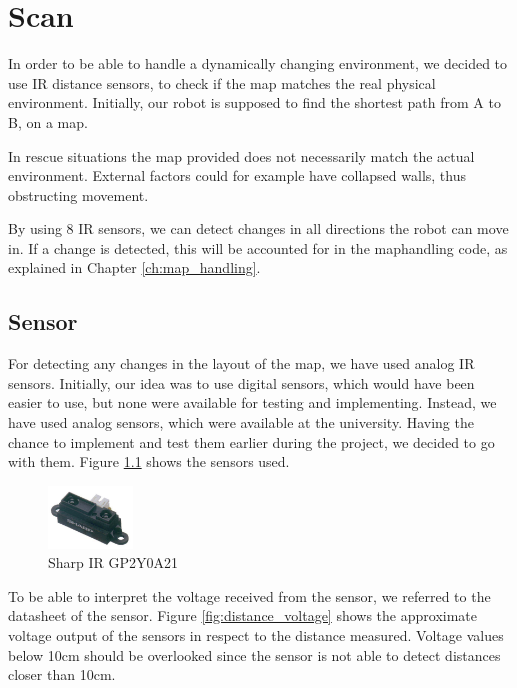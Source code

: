\chapter{Scan}\label{ch:scan}
In order to be able to handle a dynamically changing environment,
we decided to use IR distance sensors,
to check if the map matches the real physical environment.
Initially, our robot is supposed to find the 
shortest path from A to B, on a map.

In rescue situations the map provided does not necessarily match 
the actual environment.
External factors could for example have collapsed walls,
thus obstructing movement.

By using 8 IR sensors, we can detect changes in all directions 
the robot can move in. If a change is detected, this will be
accounted for in the maphandling code,
as explained in Chapter \ref{ch:map_handling}.

\newpage
\section{Sensor}\label{sec:sensor}
For detecting any changes in the layout of the map, we have used analog IR 
sensors. Initially, our idea was to use digital sensors, which would have been 
easier to use, but none were available for testing and implementing. Instead, 
we have used analog sensors, which were available at the university. Having the 
chance to implement and test them earlier during the project, we decided to go 
with them. 
Figure \ref{fig:sensor} shows the sensors used.

\begin{figure}[htp]
	\centering
	\includegraphics[width=0.2\textwidth]{figures/scan/Sensor.png}
	\caption{Sharp IR GP2Y0A21}
	\label{fig:sensor}
\end{figure}
%
To be able to interpret the voltage received from the sensor, we referred 
to the datasheet of the sensor. Figure \ref{fig:distance_voltage} shows
the approximate voltage output of the sensors in respect to the distance measured.
Voltage values below 10cm should be overlooked since the sensor is not able
to detect distances closer than 10cm.

